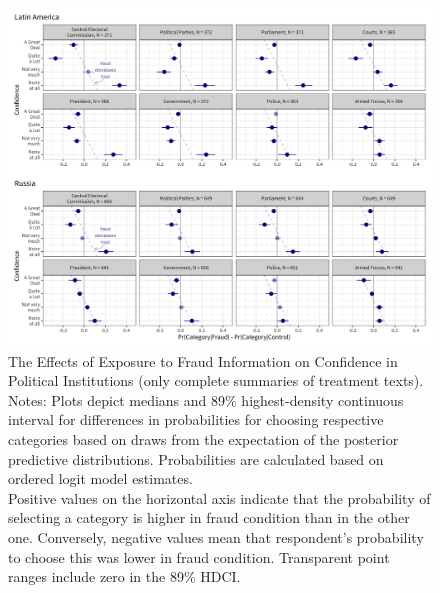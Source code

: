 \documentclass[11pt, ngerman,english,a4]{article}
\begin{document}
\begin{figure}[H]
	\centering
	\includegraphics[width=\linewidth,trim=4 4 4 4,clip]{figs/main_hdi89_3.png}
	\caption{The Effects of Exposure to Fraud Information on Confidence in Political Institutions (only complete summaries of treatment texts).  \\
		\footnotesize{Notes: Plots depict medians and 89\% highest-density continuous interval for differences in probabilities for choosing respective categories based on draws from the expectation of the posterior predictive distributions. Probabilities are calculated based on ordered logit model estimates.\\
			Positive values on the horizontal axis indicate that the probability of selecting a category is higher in fraud condition than in the other one. Conversely, negative values mean that respondent's probability to choose this was lower in fraud condition. 
Transparent point ranges include zero in the 89\% HDCI.\\
	} }
	\singlespacing
	\raggedright
	    
	\label{fig:main-3}
\end{figure}
\end{document}
